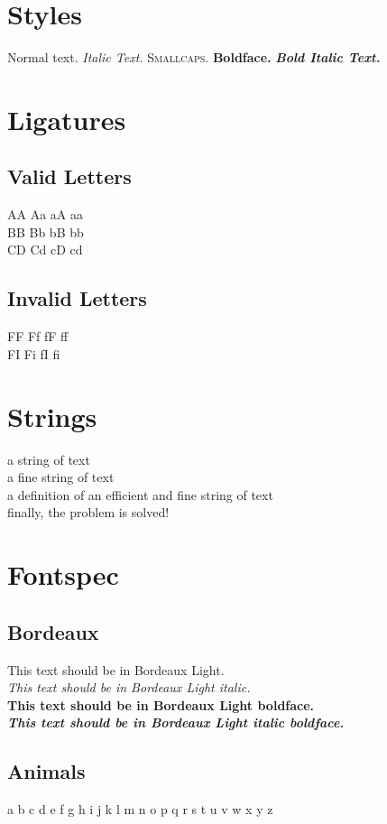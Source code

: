 \documentclass[12pt]{article}
\begin{document}
\section{Styles}
Normal text.  \textit{Italic Text.}  \textsc{Smallcaps.}  \textbf{Boldface.}  \textit{\textbf{Bold Italic Text.}}

\section{Ligatures}
\subsection{Valid Letters}
AA Aa aA aa\\
BB Bb bB bb\\
CD Cd cD cd\\
\subsection{Invalid Letters}
FF Ff fF ff\\
FI Fi fI fi\\

\section{Strings}
a string of text\\
a fine string of text\\
a definition of an efficient and fine string of text\\
finally, the problem is solved!\\

\section{Fontspec}
\subsection{Bordeaux}
{\bordeauxfont This text should be in Bordeaux Light.}\\
{\bordeauxfont \textit{This text should be in Bordeaux Light italic.}}\\
{\bordeauxfont \textbf{This text should be in Bordeaux Light boldface.}}\\
{\bordeauxfont \textbf{\textit{This text should be in Bordeaux Light italic boldface.}}}

\subsection{Animals}
{\animalsfont\Huge a b c d e f g h i j k l m n o p q r s t u v w x y z}
\end{document}
